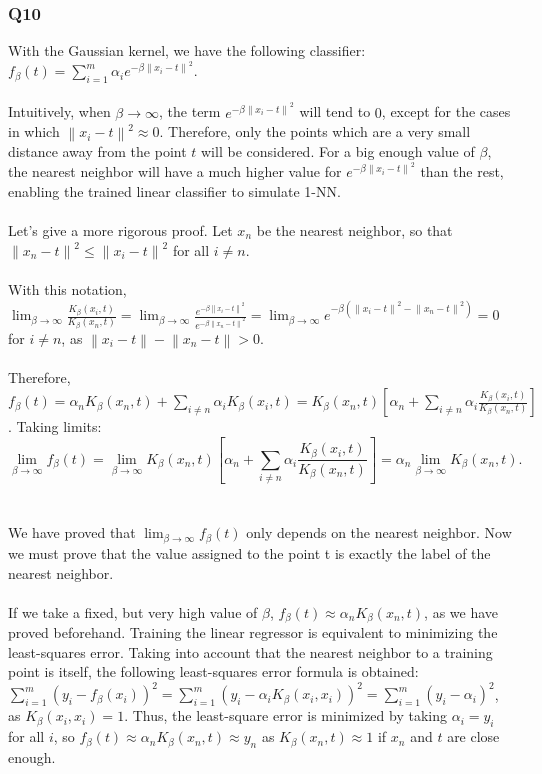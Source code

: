 \documentclass[11pt,a4paper]{article}
\begin{document}
\subsubsection{Q10}
With the Gaussian kernel, we have the following classifier: $f_{\beta}(t) = \sum_{i=1}^m \alpha_i e^{- \beta \left\lVert x_i-t \right\rVert^2}$.
\\\\
Intuitively, when $\beta \rightarrow \infty$, the term $e^{- \beta \left\lVert x_i-t \right\rVert^2}$ will tend to $0$, except for the cases in which $\left\lVert x_i-t \right\rVert^2 \approx 0$. Therefore, only the points which are a very small distance away from the point $t$ will be considered. For a big enough value of $\beta$, the nearest neighbor will have a much higher value for $e^{- \beta \left\lVert x_i-t \right\rVert^2}$ than the rest, enabling the trained linear classifier to simulate 1-NN.
\\\\
Let's give a more rigorous proof. Let $x_n$ be the nearest neighbor, so that $\left\lVert x_n-t \right\rVert^2 \leq \left\lVert x_i-t \right\rVert^2$ for all $i \neq n$.
\\\\
With this notation, $\lim_{\beta \rightarrow \infty} \frac{K_{\beta}(x_i, t)}{K_{\beta}(x_n, t)} = \lim_{\beta \rightarrow \infty} \frac{e^{- \beta \left\lVert x_i-t \right\rVert^2}}{e^{- \beta \left\lVert x_n-t \right\rVert^2}} = \lim_{\beta \rightarrow \infty} e^{-\beta(\left\lVert x_i-t \right\rVert^2 - \left\lVert x_n-t \right\rVert^2)} = 0$ for $i \neq n$, as $\left\lVert x_i-t \right\rVert - \left\lVert x_n-t \right\rVert > 0$.
\\\\
Therefore, $f_{\beta}(t) = \alpha_n K_{\beta}(x_n, t) + \sum_{i\neq n} \alpha_i K_{\beta}(x_i, t) = K_{\beta}(x_n, t)[\alpha_n + \sum_{i\neq n} \alpha_i \frac{K_{\beta}(x_i, t)}{K_{\beta}(x_n, t)}]$. Taking limits: $$\lim_{\beta \rightarrow \infty} f_{\beta}(t) = \lim_{\beta \rightarrow \infty} K_{\beta}(x_n, t)[\alpha_n + \sum_{i\neq n} \alpha_i \frac{K_{\beta}(x_i, t)}{K_{\beta}(x_n, t)}] = \alpha_n \lim_{\beta \rightarrow \infty} K_{\beta}(x_n, t).$$
\\\\
We have proved that $\lim_{\beta \rightarrow \infty} f_{\beta}(t)$ only depends on the nearest neighbor. Now we must prove that the value assigned to the point t is exactly the label of the nearest neighbor.
\\\\
If we take a fixed, but very high value of $\beta$, $f_{\beta}(t) \approx \alpha_n K_{\beta}(x_n, t)$, as we have proved beforehand. Training the linear regressor is equivalent to minimizing the least-squares error. Taking into account that the nearest neighbor to a training point is itself, the following least-squares error formula is obtained: $\sum_{i=1}^m (y_i - f_{\beta}(x_i) )^2 = \sum_{i=1}^m (y_i - \alpha_i K_{\beta}(x_i, x_i))^2 = \sum_{i=1}^m (y_i - \alpha_i)^2$, as $K_{\beta}(x_i, x_i) =1$. Thus, the least-square error is minimized by taking $\alpha_i = y_i$ for all $i$, so $f_{\beta}(t) \approx \alpha_n K_{\beta}(x_n, t) \approx y_n$ as $K_{\beta}(x_n, t) \approx 1$ if $x_n$ and $t$ are close enough.
\end{document}

